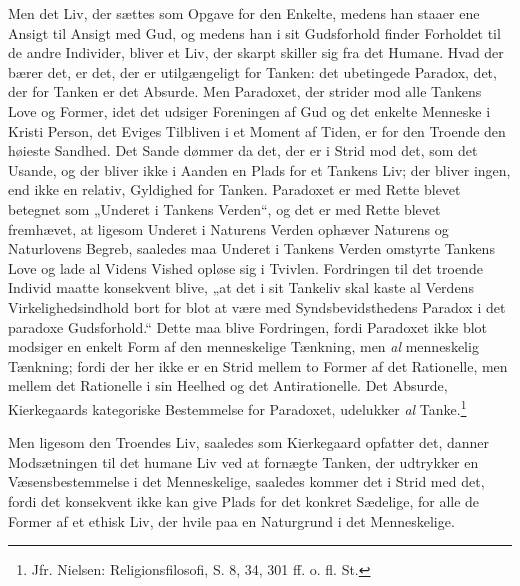 \documentclass[12pt,a4paper,openany]{book}
\newcommand{\opage}[1]{\marginnote{\footnotesize\textit{[#1]}}}
\begin{document}
Men det Liv, der sættes som Opgave for den Enkelte,
medens han staaer ene Ansigt til Ansigt med Gud, og medens
han i sit Gudsforhold finder Forholdet til de andre Individer,
bliver et Liv, der skarpt skiller sig fra det Humane.
Hvad der bærer det, er det, der er utilgængeligt for Tanken:
det ubetingede Paradox, det, der for Tanken er det Absurde.
Men Paradoxet, der strider mod alle Tankens Love og
Former, idet det udsiger Foreningen af Gud og det enkelte
Menneske i Kristi Person, det Eviges Tilbliven i et Moment
af Tiden, er for den Troende den høieste Sandhed. Det
Sande dømmer da det, der er i Strid mod det, som det
Usande, og der bliver ikke i Aanden en Plads for et Tankens
Liv; der bliver ingen, end ikke en relativ, Gyldighed
for Tanken. Paradoxet er med Rette blevet betegnet som
„Underet i Tankens Verden“, og det er med Rette blevet
fremhævet, at ligesom Underet i Naturens Verden ophæver
Naturens og Naturlovens Begreb, saaledes maa Underet i
Tankens Verden omstyrte Tankens Love og lade al Videns
Vished opløse sig i Tvivlen. Fordringen til det troende
Individ maatte konsekvent blive, „at det i sit Tankeliv skal
kaste al Verdens Virkelighedsindhold bort for blot at være med
Syndsbevidsthedens Paradox i det paradoxe Gudsforhold.“
Dette maa blive Fordringen, fordi Paradoxet ikke blot modsiger
en enkelt Form af den menneskelige Tænkning, men \emph{al} menneskelig
Tænkning; fordi der her ikke er en Strid mellem to
Former af det Rationelle, men mellem det Rationelle i sin
Heelhed og det Antirationelle. Det Absurde, Kierkegaards
kategoriske Bestemmelse for Paradoxet, udelukker \emph{al} Tanke.\footnote{Jfr. Nielsen: Religionsfilosofi, S. 8, 34, 301 ff. o. fl. St.}

\opage{437}Men ligesom den Troendes Liv, saaledes som Kierkegaard
opfatter det, danner Modsætningen til det humane Liv
ved at fornægte Tanken, der udtrykker en Væsensbestemmelse
i det Menneskelige, saaledes kommer det i Strid med det,
fordi det konsekvent ikke kan give Plads for det konkret
Sædelige, for alle de Former af et ethisk Liv, der hvile paa
en Naturgrund i det Menneskelige.
\end{document}
